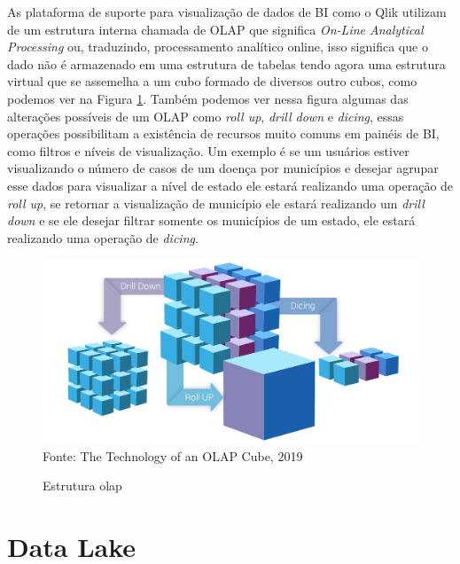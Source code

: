 \documentclass[
	12pt,				%
	openright,			%
	oneside,			%
	a4paper,			%
	chapter=TITLE,		%
	section=TITLE,		%
	subsection=TITLE,	%
	subsubsection=TITLE,%
	english,			%
	brazil				%
	]{abntex2}
\theoremstyle{definition}
\begin{document}
    As plataforma de suporte para visualização de dados de BI como o Qlik utilizam de um estrutura interna chamada de OLAP que significa \textit{On-Line Analytical Processing} ou, traduzindo, processamento analítico online, isso significa que o dado não é armazenado em uma estrutura de tabelas tendo agora uma estrutura virtual que se assemelha a um cubo formado de diversos outro cubos, como podemos ver na Figura \ref{estrutura olap}. Também podemos ver nessa figura algumas das alterações possíveis de um OLAP como \textit{roll up}, \textit{drill down} e \textit{dicing}, essas operações possibilitam a existência de recursos muito comuns em painéis de BI, como filtros e níveis de visualização. Um exemplo é se um usuários estiver visualizando o número de casos de um doença por municípios e desejar agrupar esse dados para visualizar a nível de estado ele estará realizando uma operação de \textit{roll up}, se retornar a visualização de município ele estará realizando um \textit{drill down} e se ele desejar filtrar somente os municípios de um estado, ele estará realizando uma operação de \textit{dicing}.
    
    \begin{figure}[H]
         \centering
         \caption{Estrutura olap}
         \includegraphics[scale=0.2]{imagens/olap_operations.jpg}
         \\{\footnotesize Fonte: The Technology of an OLAP Cube, 2019}
         \label{estrutura olap}
    \end{figure}
    
    
\section{Data Lake}
\end{document}
